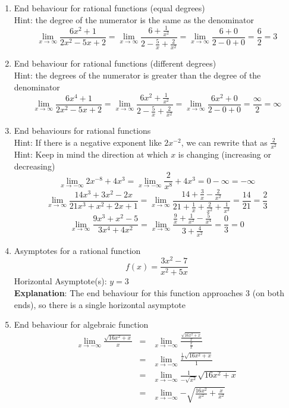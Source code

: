 \documentclass{article}
\begin{document}
\begin{enumerate}
	\item End behaviour for rational functions (equal degrees)
		\\ Hint: the degree of the numerator is the same as the denominator
		$$\lim_{x \to \infty}{\frac{6x^2 + 1}{2x^2 - 5x + 2}} = \lim_{x \to \infty}{\frac{6 + \frac{1}{x^2}}{2 - \frac{5}{x} + \frac{2}{x^2}}} = \lim_{x \to \infty}{\frac{6 + 0}{2 - 0 + 0}} = \frac{6}{2} = 3$$
	\item End behaviour for rational functions (different degrees)
		\\ Hint: the degrees of the numerator is greater than the degree of the denominator
		$$\lim_{x \to \infty}{\frac{6x^4 + 1}{2x^2 - 5x + 2}} = \lim_{x \to \infty}{\frac{6x^2 + \frac{1}{x^2}}{2 - \frac{5}{x} + \frac{2}{x^2}}} = \lim_{x \to \infty}{\frac{6x^2 + 0}{2 - 0 + 0}} = \frac{\infty}{2} = \infty$$
	\item End behaviours for rational functions
		\\ Hint: If there is a negative exponent like $2x^{-2}$, we can rewrite that as $\frac{2}{x^2}$
		\\ Hint: Keep in mind the direction at which $x$ is changing (increasing or decreasing)
		$$\lim_{x \to - \infty}{2x^{-8} + 4x^3} = \lim_{x \to - \infty}{\frac{2}{x^8} + 4x^3} = 0 - \infty = - \infty$$
		$$\lim_{x \to \infty}{\frac{14x^3 + 3x^2 - 2x}{21x^3 + x^2 + 2x + 1}} = \lim_{x \to \infty}{\frac{14 + \frac{3}{x} - \frac{2}{x^2}}{21 + \frac{1}{x} + \frac{2}{x^2} + \frac{1}{x^3}}} = \frac{14}{21} = \frac{2}{3}$$
		$$\lim_{x \to \infty}{\frac{9x^3 + x^2 - 5}{3x^4 + 4x^2}} = \lim_{x \to \infty}{\frac{\frac{9}{x} + \frac{1}{x^2} - \frac{5}{x^4}}{3 + \frac{4}{x^2}}} = \frac{0}{3} = 0$$
	\item Asymptotes for a rational function
		$$f(x) = \frac{3x^2 - 7}{x^2 + 5x}$$
		Horizontal Asymptote(s): $y = 3$
		\\ \textbf{Explanation}: The end behaviour for this function approaches $3$ (on both ends), so there is a single horizontal asymptote
	\item End behaviour for algebraic function
		\begin{eqnarray}
			\lim_{x \to - \infty}{\frac{\sqrt{16x^2 + x}}{x}} &=& \lim_{x \to - \infty}{\frac{\frac{\sqrt{16x^2 + x}}{x}}{\frac{x}{x}}} \\
			&=& \lim_{x \to - \infty}{\frac{\frac{1}{x}\sqrt{16x^2 + x}}{1}} \\
			&=& \lim_{x \to - \infty}{\frac{1}{-\sqrt{x^2}}\sqrt{16x^2 + x}} \\
			&=& \lim_{x \to - \infty}{- \sqrt{\frac{16x^2}{x^2} + \frac{x}{x^2}}} \\

\end{eqnarray}
\end{enumerate}
\end{document}
